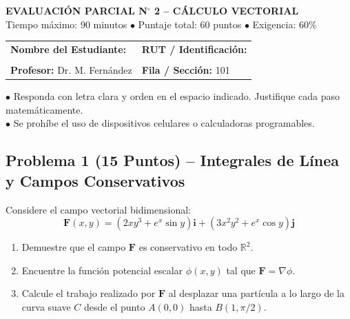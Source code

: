 \documentclass[11pt, letterpaper]{article}
\begin{document}
\begin{tcolorbox}[colback=darkslate, colframe=primary, arc=2mm, boxrule=1.5pt]
  \color{white}
  \begin{center}
    {\Large \bfseries EVALUACIÓN PARCIAL N$^\circ$ 2 -- CÁLCULO VECTORIAL}\\[0.2cm]
    {\small Tiempo máximo: 90 minutos \quad $\bullet$ \quad Puntaje total: 60 puntos \quad $\bullet$ \quad Exigencia: 60\%}
  \end{center}
\end{tcolorbox}

\vspace{0.3cm}

\noindent
\begin{tabular}{|p{10cm}|p{6.8cm}|}
  \hline
  \textbf{Nombre del Estudiante:} & \textbf{RUT / Identificación:} \\
  \vspace{0.3cm} & \vspace{0.3cm} \\
  \hline
  \textbf{Profesor:} Dr. M. Fernández & \textbf{Fila / Sección:} 101 \\
  \hline
\end{tabular}

\vspace{0.4cm}

\begin{tcolorbox}[colback=primary!10, colframe=primary, arc=2mm, title=\textbf{Instrucciones Generales}]
  $\bullet$ Responda con letra clara y orden en el espacio indicado. Justifique cada paso matemáticamente. \\
  $\bullet$ Se prohíbe el uso de dispositivos celulares o calculadoras programables.
\end{tcolorbox}

\vspace{0.5cm}

\subsection*{Problema 1 (15 Puntos) -- Integrales de Línea y Campos Conservativos}
Considere el campo vectorial bidimensional:
\begin{equation*}
  \mathbf{F}(x, y) = \left( 2x y^3 + e^x \sin y \right) \mathbf{i} + \left( 3x^2 y^2 + e^x \cos y \right) \mathbf{j}
\end{equation*}

\begin{enumerate}[label=\textbf{\alph*)}]
  \item Demuestre que el campo $\mathbf{F}$ es conservativo en todo $\mathbb{R}^2$.
  \item Encuentre la función potencial escalar $\phi(x, y)$ tal que $\mathbf{F} = \nabla \phi$.
  \item Calcule el trabajo realizado por $\mathbf{F}$ al desplazar una partícula a lo largo de la curva suave $C$ desde el punto $A(0, 0)$ hasta $B(1, \pi/2)$.
\end{enumerate}
\end{document}
